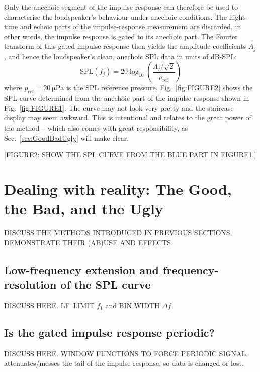 \documentclass[12pt,a4paper]{article}
\providecommand{\secn}[1]{Sec.~\ref{sec:#1}}
\providecommand{\figr}[1]{Fig.~\ref{fig:#1}}
\providecommand{\pRef}{p_\mathrm{ref}}
\begin{document}
Only the anechoic segment of the impulse response can therefore be used to characterise the loudspeaker’s behaviour under anechoic conditions. The flight-time and echoic parts of the impulse-response measurement are discarded, in other words, the impulse response is gated to its anechoic part. The Fourier transform of this gated impulse response then yields the amplitude coefficients $A_j$, and hence the loudspeaker’s clean, anechoic SPL data in units of dB-SPL:
\[
\mathrm{SPL}(f_j) = 20 \log_{10}\left( \frac{A_j / \sqrt{2}}{\pRef} \right)
\]
where $\pRef = \SI{20}{\micro\pascal}$ is the SPL reference pressure. \figr{FIGURE2} shows the SPL curve determined from the anechoic part of the impulse response shown in \figr{FIGURE1}. The curve may not look very pretty and the staircase display may seem awkward. This is intentional and relates to the great power of the method -- which also comes with great responsibility, as \secn{GoodBadUgly} will make clear.

[FIGURE2: SHOW THE SPL CURVE FROM THE BLUE PART IN FIGURE1.]


\section{Dealing with reality: The Good, the Bad, and the Ugly}
DISCUSS THE METHODS INTRODUCED IN PREVIOUS SECTIONS, DEMONSTRATE THEIR (AB)USE AND EFFECTS 


\subsection{Low-frequency extension and frequency-resolution of the SPL curve}
DISCUSS HERE. LF LIMIT $f_1$ and BIN WIDTH $\Delta f$.


\subsection{Is the gated impulse response periodic?}
DISCUSS HERE. WINDOW FUNCTIONS TO FORCE PERIODIC SIGNAL. attenuates/messes the tail of the impulse response, so data is changed or lost.
\end{document}
